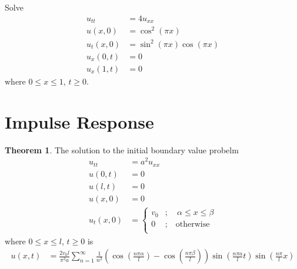\documentclass[titlepage, fleqn, a4paper, 12pt, twoside]{article}
\theoremstyle{definition}
\theoremstyle{theorem}
\newtheorem{theorem}{Theorem}
\begin{document}
\begin{question}
	Solve
	\begin{align*}
		u_{t t}  & = 4 u_{x x}                 \\
		u(x,0)   & = \cos^2(\pi x)             \\
		u_t(x,0) & = \sin^2(\pi x) \cos(\pi x) \\
		u_x(0,t) & = 0                         \\
		u_x(1,t) & = 0
	\end{align*}
	where $0 \le x \le 1$, $t \ge 0$.
\end{question}

\section{Impulse Response}

\begin{theorem}
	The solution to the initial boundary value probelm
	\begin{align*}
		u_{t t} &= a^2 u_{x x}\\
		u(0,t) &= 0\\
		u(l,t) &= 0\\
		u(x,0) &= 0\\
		u_t(x,0) &=
			\begin{cases}
				v_0 & ;\quad \alpha \le x \le \beta \\
				0   & ;\quad \text{otherwise}       \\
			\end{cases}
	\end{align*}
	where $0 \le x \le l$, $t \ge 0$ is
	\begin{align*}
		u(x,t) & = \frac{2 v_0 l}{\pi^2 a} \sum\limits_{n = 1}^{\infty} \frac{1}{n^2} \left( \cos\left( \frac{n \pi \alpha}{l} \right) - \cos\left( \frac{n \pi \beta}{l} \right) \right) \sin\left( \frac{n \pi a}{l} t \right) \sin\left( \frac{n \pi}{l} x \right)
	\end{align*}
\end{theorem}
\end{document}
